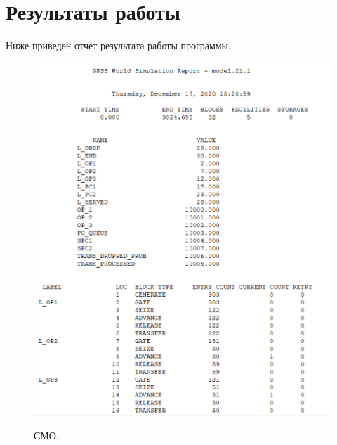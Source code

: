 \documentclass[a4paper,12pt]{article}
\begin{document}
	
	\newpage
	
	
	\section*{Результаты работы}
	
	Ниже приведен отчет результата работы программы.
	
	\begin{figure}[h!]
		\begin{center}
			{\includegraphics[scale = 0.7]{1.png}}
			\label{ris:smo1}
		\end{center}
		\caption{СМО.}
	\end{figure}

	\newpage
\end{document}
